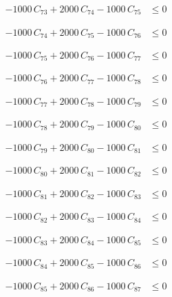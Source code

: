 \documentclass[a4paper,11pt]{article}
\begin{document}
\begin{align}
-1000\,C_{73} + 2000\,C_{74} - 1000\,C_{75} &\leq 0 \nonumber
\end{align}

\begin{align}
-1000\,C_{74} + 2000\,C_{75} - 1000\,C_{76} &\leq 0 \nonumber
\end{align}

\begin{align}
-1000\,C_{75} + 2000\,C_{76} - 1000\,C_{77} &\leq 0 \nonumber
\end{align}

\begin{align}
-1000\,C_{76} + 2000\,C_{77} - 1000\,C_{78} &\leq 0 \nonumber
\end{align}

\begin{align}
-1000\,C_{77} + 2000\,C_{78} - 1000\,C_{79} &\leq 0 \nonumber
\end{align}

\begin{align}
-1000\,C_{78} + 2000\,C_{79} - 1000\,C_{80} &\leq 0 \nonumber
\end{align}

\begin{align}
-1000\,C_{79} + 2000\,C_{80} - 1000\,C_{81} &\leq 0 \nonumber
\end{align}

\begin{align}
-1000\,C_{80} + 2000\,C_{81} - 1000\,C_{82} &\leq 0 \nonumber
\end{align}

\begin{align}
-1000\,C_{81} + 2000\,C_{82} - 1000\,C_{83} &\leq 0 \nonumber
\end{align}

\begin{align}
-1000\,C_{82} + 2000\,C_{83} - 1000\,C_{84} &\leq 0 \nonumber
\end{align}

\begin{align}
-1000\,C_{83} + 2000\,C_{84} - 1000\,C_{85} &\leq 0 \nonumber
\end{align}

\begin{align}
-1000\,C_{84} + 2000\,C_{85} - 1000\,C_{86} &\leq 0 \nonumber
\end{align}

\begin{align}
-1000\,C_{85} + 2000\,C_{86} - 1000\,C_{87} &\leq 0 \nonumber
\end{align}
\end{document}

